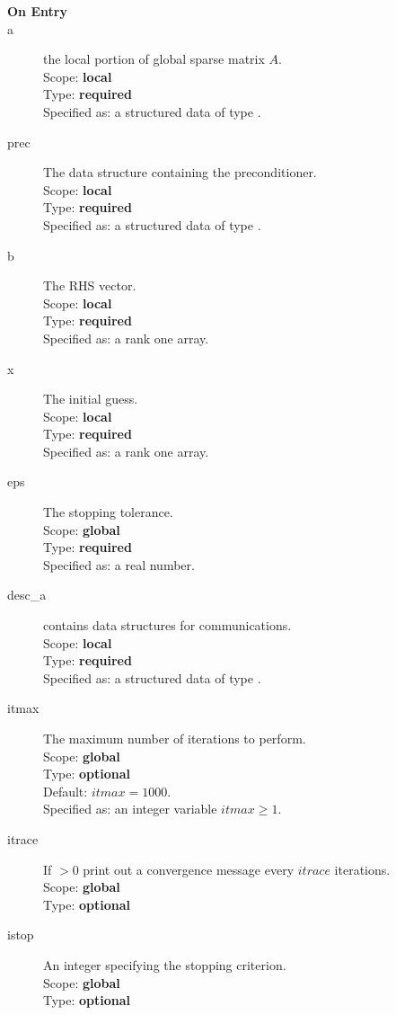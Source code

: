 \begin{description}
\item[\bf On Entry]
\item[a] the local portion of global sparse matrix
$A$. \\
Scope: {\bf local} \\
Type: {\bf required}\\
Specified as: a structured data of type \spdata.
\item[prec] The data structure containing the preconditioner.\\
Scope: {\bf local} \\
Type: {\bf required}\\
Specified as: a structured data of type \precdata.
\item[b] The RHS vector. \\
Scope: {\bf local} \\
Type: {\bf required}\\
Specified as: a rank one array.
\item[x] The initial guess. \\
Scope: {\bf local} \\
Type: {\bf required}\\
Specified as: a rank one array.
\item[eps] The stopping tolerance. \\
Scope: {\bf global} \\
Type: {\bf required}\\
Specified as: a real number. 
\item[desc\_a] contains data structures for communications.\\
Scope: {\bf local} \\
Type: {\bf required}\\
Specified as: a structured data of type \descdata.
\item[itmax]  The maximum number of iterations to perform.\\
Scope: {\bf global} \\
Type: {\bf optional}\\
Default: $itmax = 1000$.\\
Specified as: an integer variable $itmax \ge 1$.
\item[itrace] If $>0$  print out a convergence message every $itrace$ iterations.\\
Scope: {\bf global} \\
Type: {\bf optional}\\
\item[istop]  An integer specifying the stopping criterion.\\
Scope: {\bf global} \\
Type: {\bf optional}\\


\end{description}
